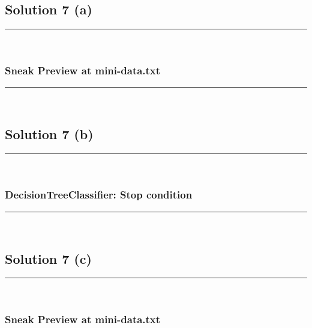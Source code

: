 \documentclass{article}
\begin{document}
\newpage


\subsection*{Solution 7 (a)}
\noindent\rule{\textwidth}{0.4pt}\\

\subsubsection*{Sneak Preview at mini-data.txt}
\begin{comment}
  \begin{center}
    \begin{figure}
      \texttt{[image: /path/to/sneak\_peak.png]}
      \caption{Sneak Peak of mini-data.txt, reveals a square doughnut shape.}
    \end{figure}
  \end{center}
\end{comment}

\noindent\rule{\textwidth}{0.4pt}\\

\newpage

\subsection*{Solution 7 (b)}
\noindent\rule{\textwidth}{0.4pt}\\

\subsubsection*{DecisionTreeClassifier: Stop condition}
\begin{comment}
\begin{lstlisting}
PYTHON snip of stop condition
\end{lstlisting}
\end{comment}

\noindent\rule{\textwidth}{0.4pt}\\

\newpage

\subsection*{Solution 7 (c)}
\noindent\rule{\textwidth}{0.4pt}\\

\subsubsection*{Sneak Preview at mini-data.txt}
\begin{comment}
  \begin{center}
    \begin{figure}
      \texttt{[image: /path/to/plot\_tree.png]}
      \caption{plot from sklearn.tree.plot_tree}
    \end{figure}
  \end{center}
\end{comment}
\end{document}

